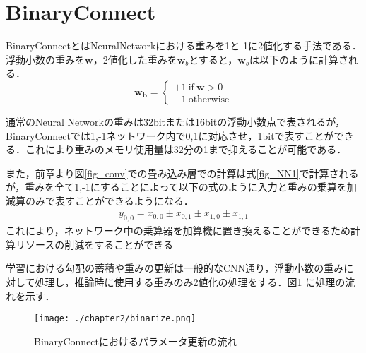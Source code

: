 \section{BinaryConnect}
BinaryConnectとはNeuralNetworkにおける重みを1と-1に2値化する手法である．浮動小数の重みを$\bm{w}$，2値化した重みを$\bm{w}_b$とすると，$\bm{w}_b$は以下のように計算される．
\begin{displaymath}
  \bm{w_{b}} = \left\{ \begin{array}{l}
  \displaystyle 
  +1\:  \text{if}\:  \bm{w} > 0 \\
  -1\:\text{otherwise}
  \end{array} \right.
\end{displaymath}

通常のNeural Networkの重みは32bitまたは16bitの浮動小数点で表されるが，BinaryConnectでは1,-1ネットワーク内で0,1に対応させ，1bitで表すことができる．これにより重みのメモリ使用量は32分の1まで抑えることが可能である．

また，前章より図\ref{fig_conv}での畳み込み層での計算は式\ref{fig_NN1}で計算されるが，重みを全て1,-1にすることによって以下の式のように入力と重みの乗算を加減算のみで表すことができるようになる．
\begin{align}
  y_{0,0} = x_{0,0} \pm x_{0,1} \pm x_{1,0} \pm x_{1,1}
\end{align}
これにより，ネットワーク中の乗算器を加算機に置き換えることができるため計算リソースの削減をすることができる

学習における勾配の蓄積や重みの更新は一般的なCNN通り，浮動小数の重みに対して処理し，推論時に使用する重みのみ2値化の処理をする．図\ref{fig_binarize} に処理の流れを示す\cite{courbariaux2016binaryconnect}．
\begin{figure}[htbp]
  \begin{center}
    \texttt{[image: ./chapter2/binarize.png]}
    \caption{BinaryConnectにおけるパラメータ更新の流れ}
    \label{fig_binarize}
  \end{center}
\end{figure}
